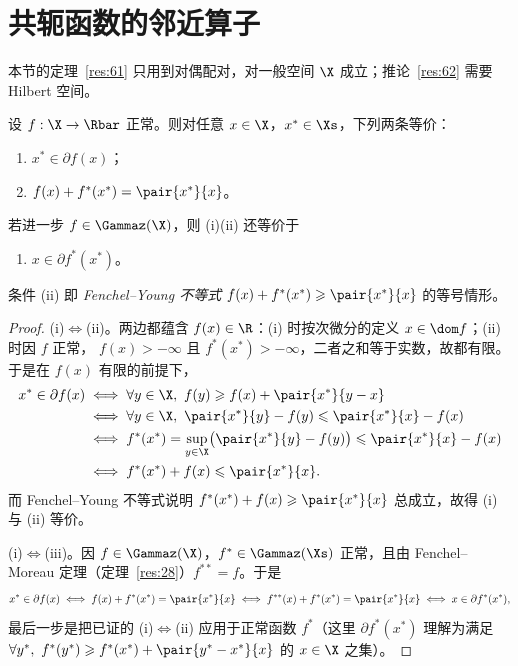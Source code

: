 \section{共轭函数的邻近算子}

本节的定理~\ref{res:61} 只用到对偶配对，对一般空间 $\X$ 成立；推论~\ref{res:62} 需要 Hilbert 空间。

\begin{theorem}[次微分与共轭]
\label{res:61}
设 $f:\X\to\Rbar$ 正常。则对任意 $x\in\X$，$x^*\in\Xs$，下列两条等价：
\begin{enumerate}[label=(\roman*)]
  \item $x^*\in\partial f(x)$；
  \item $f(x)+f^*(x^*)=\pair{x^*}{x}$。
\end{enumerate}
若进一步 $f\in\Gammaz(\X)$，则 (i)(ii) 还等价于
\begin{enumerate}[label=(\roman*),start=3]
  \item $x\in\partial f^*(x^*)$。
\end{enumerate}
\end{theorem}

条件 (ii) 即 \emph{Fenchel--Young 不等式} $f(x)+f^*(x^*)\geqslant\pair{x^*}{x}$ 的等号情形。

\begin{proof}
(i)$\iff$(ii)。两边都蕴含 $f(x)\in\R$：(i) 时按次微分的定义 $x\in\dom f$；(ii) 时因 $f$ 正常，
$f(x)>-\infty$ 且 $f^*(x^*)>-\infty$，二者之和等于实数，故都有限。于是在 $f(x)$ 有限的前提下，
\[
  \begin{aligned}
  x^*\in\partial f(x)
  &\iff\forall y\in\X,\ f(y)\geqslant f(x)+\pair{x^*}{y-x}\\
  &\iff\forall y\in\X,\ \pair{x^*}{y}-f(y)\leqslant\pair{x^*}{x}-f(x)\\
  &\iff f^*(x^*)=\sup_{y\in\X}\bigl(\pair{x^*}{y}-f(y)\bigr)\leqslant\pair{x^*}{x}-f(x)\\
  &\iff f^*(x^*)+f(x)\leqslant\pair{x^*}{x}.
  \end{aligned}
\]
而 Fenchel--Young 不等式说明 $f^*(x^*)+f(x)\geqslant\pair{x^*}{x}$ 总成立，故得 (i) 与 (ii) 等价。

(i)$\iff$(iii)。因 $f\in\Gammaz(\X)$，$f^*\in\Gammaz(\Xs)$ 正常，且由 Fenchel--Moreau 定理（定理~\ref{res:28}）$f^{**}=f$。于是
\[
  x^*\in\partial f(x)\iff f(x)+f^*(x^*)=\pair{x^*}{x}
  \iff f^{**}(x)+f^*(x^*)=\pair{x^*}{x}
  \iff x\in\partial f^*(x^*),
\]
最后一步是把已证的 (i)$\iff$(ii) 应用于正常函数 $f^*$（这里 $\partial f^*(x^*)$ 理解为满足
$\forall y^*,\ f^*(y^*)\geqslant f^*(x^*)+\pair{y^*-x^*}{x}$ 的 $x\in\X$ 之集）。
\end{proof}

